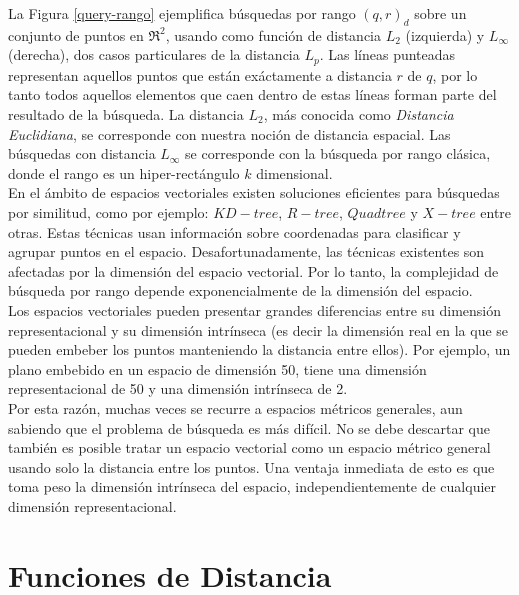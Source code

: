 La Figura \ref{query-rango} ejemplifica b\'usquedas por rango $(q,r)_d$ sobre un 
conjunto de puntos en $\Re^2$, usando como funci\'on de distancia $L_2$ (izquierda) 
y $L_{\infty}$ (derecha), dos casos particulares de la distancia $L_p$.
Las l\'ineas punteadas representan aquellos puntos que est\'an ex\'actamente a distancia
$r$ de $q$, por lo tanto todos aquellos elementos que caen dentro de estas l\'ineas 
forman parte del resultado de la b\'usqueda. La distancia $L_2$, m\'as conocida como
\textit{Distancia Euclidiana}, se corresponde con nuestra noci\'on de distancia espacial.
 Las b\'usquedas con distancia $L_{\infty}$ se corresponde con la b\'usqueda por rango
cl\'asica, donde el rango es un hiper-rect\'angulo $k$ dimensional.\\

En el \'ambito de espacios vectoriales existen soluciones eficientes para b\'usquedas por
similitud, como por ejemplo: $KD-tree$, $R-tree$, $Quad tree$ y $X-tree$ entre otras. Estas
t\'ecnicas usan informaci\'on sobre coordenadas para clasificar y agrupar puntos en el espacio. 
Desafortunadamente, las t\'ecnicas existentes son afectadas por la dimensi\'on del espacio 
vectorial. Por lo tanto, la complejidad de b\'usqueda por rango depende exponencialmente de la 
dimensi\'on del espacio.\\
 
Los espacios vectoriales pueden presentar grandes diferencias entre su dimensi\'on 
representacional y su dimensi\'on intr\'inseca (es decir la dimensi\'on real en la que se pueden 
embeber los puntos manteniendo la distancia entre ellos). Por ejemplo, un plano embebido en un 
espacio de dimensi\'on 50, tiene una dimensi\'on representacional de 50 y una dimensi\'on 
intr\'inseca de 2.\\

Por esta raz\'on, muchas veces se recurre a espacios m\'etricos generales, aun sabiendo que el 
problema de b\'usqueda es m\'as dif\'icil. No se debe descartar que tambi\'en es posible tratar un 
espacio vectorial como un espacio m\'etrico general usando solo la distancia entre los puntos. Una 
ventaja inmediata de esto es que toma peso la dimensi\'on intr\'inseca del espacio, 
independientemente de cualquier dimensi\'on representacional.\\

\section{Funciones de Distancia}

